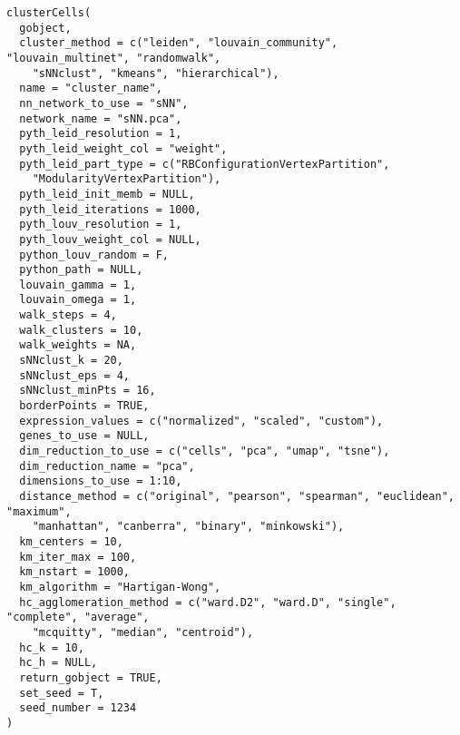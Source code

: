\documentclass[a4paper]{book}
\begin{document}
\begin{Usage}
\begin{verbatim}
clusterCells(
  gobject,
  cluster_method = c("leiden", "louvain_community", "louvain_multinet", "randomwalk",
    "sNNclust", "kmeans", "hierarchical"),
  name = "cluster_name",
  nn_network_to_use = "sNN",
  network_name = "sNN.pca",
  pyth_leid_resolution = 1,
  pyth_leid_weight_col = "weight",
  pyth_leid_part_type = c("RBConfigurationVertexPartition",
    "ModularityVertexPartition"),
  pyth_leid_init_memb = NULL,
  pyth_leid_iterations = 1000,
  pyth_louv_resolution = 1,
  pyth_louv_weight_col = NULL,
  python_louv_random = F,
  python_path = NULL,
  louvain_gamma = 1,
  louvain_omega = 1,
  walk_steps = 4,
  walk_clusters = 10,
  walk_weights = NA,
  sNNclust_k = 20,
  sNNclust_eps = 4,
  sNNclust_minPts = 16,
  borderPoints = TRUE,
  expression_values = c("normalized", "scaled", "custom"),
  genes_to_use = NULL,
  dim_reduction_to_use = c("cells", "pca", "umap", "tsne"),
  dim_reduction_name = "pca",
  dimensions_to_use = 1:10,
  distance_method = c("original", "pearson", "spearman", "euclidean", "maximum",
    "manhattan", "canberra", "binary", "minkowski"),
  km_centers = 10,
  km_iter_max = 100,
  km_nstart = 1000,
  km_algorithm = "Hartigan-Wong",
  hc_agglomeration_method = c("ward.D2", "ward.D", "single", "complete", "average",
    "mcquitty", "median", "centroid"),
  hc_k = 10,
  hc_h = NULL,
  return_gobject = TRUE,
  set_seed = T,
  seed_number = 1234
)
\end{verbatim}
\end{Usage}
%
\end{document}
